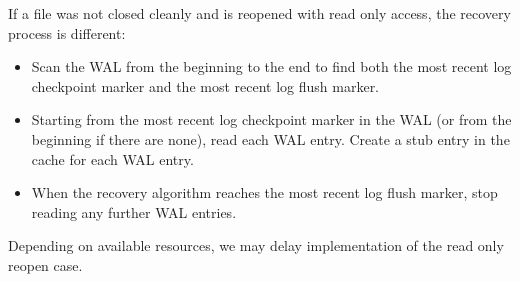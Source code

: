 If a file was not closed cleanly and is reopened with read only access, the recovery process is different:

\begin{itemize}
    \item Scan the WAL from the beginning to the end to find both the most recent log checkpoint marker and the most recent log flush marker.
    \item Starting from the most recent log checkpoint marker in the WAL (or from the beginning if there are none), read each WAL entry. Create a stub entry in the cache for each WAL entry.
    \item When the recovery algorithm reaches the most recent log flush marker, stop reading any further WAL entries.
\end{itemize}

Depending on available resources, we may delay implementation of the read only reopen case.
